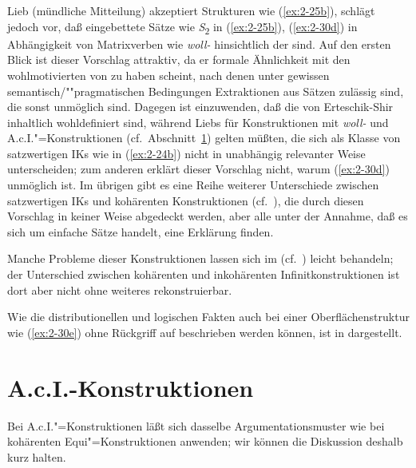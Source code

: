 \documentclass[output=paper]{langsci/langscibook}
\begin{document}
Lieb (mündliche Mitteilung) akzeptiert Strukturen wie (\ref{ex:2-25b}), schlägt jedoch vor, daß eingebettete Sätze wie \textit{S}\textsubscript{2} in (\ref{ex:2-25b}), (\ref{ex:2-30d}) in Abhängigkeit von Matrixverben wie \textit{woll-} hinsichtlich der   sind. Auf den ersten Blick ist dieser Vorschlag attraktiv, da er formale Ähnlichkeit mit den wohlmotivierten  von \citet{Erteschik73} zu haben scheint, nach denen unter gewissen semantisch/""pragmatischen Bedingungen Extraktionen aus Sätzen zulässig sind, die sonst unmöglich sind. Dagegen ist einzuwenden, daß die  von Erteschik-Shir inhaltlich wohldefiniert sind, während Liebs  für Konstruktionen mit \textit{woll-} und A.c.I."=Konstruktionen (cf.\ Abschnitt~\ref{sec:2-3}) gelten müßten, die sich als Klasse von satzwertigen IKs wie in (\ref{ex:2-24b}) nicht in unabhängig relevanter Weise unterscheiden; zum anderen erklärt dieser Vorschlag nicht, warum (\ref{ex:2-30d}) unmöglich ist. Im übrigen gibt es eine Reihe weiterer Unterschiede zwischen satzwertigen IKs und kohärenten Konstruktionen (cf.\ \citealt{Bech1955, Evers75}), die durch diesen Vorschlag in keiner Weise abgedeckt werden, aber alle unter der Annahme, daß es sich um einfache Sätze handelt, eine Erklärung finden.

Manche Probleme dieser Konstruktionen lassen sich im  (cf.\ \citealt{Chomsky77, Chomsky78, Koster78}) leicht behandeln; der Unterschied zwischen kohärenten und inkohärenten Infinitkonstruktionen ist dort aber nicht ohne weiteres rekonstruierbar.

Wie die distributionellen und logischen Fakten auch bei einer Oberflächenstruktur wie (\ref{ex:2-30e}) ohne Rückgriff auf  beschrieben werden können, ist in \citet[84f.\ und 173ff.]{Hoehle78a} dargestellt.

\section{A.c.I.-Konstruktionen}%
\label{sec:2-3}

\largerpage
Bei A.c.I."=Konstruktionen läßt sich dasselbe Argumentationsmuster wie bei kohärenten Equi"=Konstruktionen anwenden; wir können die Diskussion deshalb kurz halten.
\end{document}
